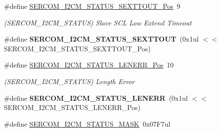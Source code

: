 \begin{DoxyCompactItemize}
\item 
\hypertarget{group___s_a_m_l21___s_e_r_c_o_m_gad74043fef8f65fd41e3b3f9534e2b634}{}\#define \hyperlink{group___s_a_m_l21___s_e_r_c_o_m_gad74043fef8f65fd41e3b3f9534e2b634}{S\+E\+R\+C\+O\+M\+\_\+\+I2\+C\+M\+\_\+\+S\+T\+A\+T\+U\+S\+\_\+\+S\+E\+X\+T\+T\+O\+U\+T\+\_\+\+Pos}~9\label{group___s_a_m_l21___s_e_r_c_o_m_gad74043fef8f65fd41e3b3f9534e2b634}

\begin{DoxyCompactList}\small\item\em (S\+E\+R\+C\+O\+M\+\_\+\+I2\+C\+M\+\_\+\+S\+T\+A\+T\+U\+S) Slave S\+C\+L Low Extend Timeout \end{DoxyCompactList}\item 
\hypertarget{group___s_a_m_l21___s_e_r_c_o_m_ga58276622f55c08b70b9b63bb868cc93f}{}\#define {\bfseries S\+E\+R\+C\+O\+M\+\_\+\+I2\+C\+M\+\_\+\+S\+T\+A\+T\+U\+S\+\_\+\+S\+E\+X\+T\+T\+O\+U\+T}~(0x1ul $<$$<$ S\+E\+R\+C\+O\+M\+\_\+\+I2\+C\+M\+\_\+\+S\+T\+A\+T\+U\+S\+\_\+\+S\+E\+X\+T\+T\+O\+U\+T\+\_\+\+Pos)\label{group___s_a_m_l21___s_e_r_c_o_m_ga58276622f55c08b70b9b63bb868cc93f}

\item 
\hypertarget{group___s_a_m_l21___s_e_r_c_o_m_ga41947e3770e63546711caaab86f7988b}{}\#define \hyperlink{group___s_a_m_l21___s_e_r_c_o_m_ga41947e3770e63546711caaab86f7988b}{S\+E\+R\+C\+O\+M\+\_\+\+I2\+C\+M\+\_\+\+S\+T\+A\+T\+U\+S\+\_\+\+L\+E\+N\+E\+R\+R\+\_\+\+Pos}~10\label{group___s_a_m_l21___s_e_r_c_o_m_ga41947e3770e63546711caaab86f7988b}

\begin{DoxyCompactList}\small\item\em (S\+E\+R\+C\+O\+M\+\_\+\+I2\+C\+M\+\_\+\+S\+T\+A\+T\+U\+S) Length Error \end{DoxyCompactList}\item 
\hypertarget{group___s_a_m_l21___s_e_r_c_o_m_gac6dffc192931978069daa23d6150013e}{}\#define {\bfseries S\+E\+R\+C\+O\+M\+\_\+\+I2\+C\+M\+\_\+\+S\+T\+A\+T\+U\+S\+\_\+\+L\+E\+N\+E\+R\+R}~(0x1ul $<$$<$ S\+E\+R\+C\+O\+M\+\_\+\+I2\+C\+M\+\_\+\+S\+T\+A\+T\+U\+S\+\_\+\+L\+E\+N\+E\+R\+R\+\_\+\+Pos)\label{group___s_a_m_l21___s_e_r_c_o_m_gac6dffc192931978069daa23d6150013e}

\item 
\hypertarget{group___s_a_m_l21___s_e_r_c_o_m_ga0fa56c1fea0aa0e3eb48362289dc465b}{}\#define \hyperlink{group___s_a_m_l21___s_e_r_c_o_m_ga0fa56c1fea0aa0e3eb48362289dc465b}{S\+E\+R\+C\+O\+M\+\_\+\+I2\+C\+M\+\_\+\+S\+T\+A\+T\+U\+S\+\_\+\+M\+A\+S\+K}~0x07\+F7ul\label{group___s_a_m_l21___s_e_r_c_o_m_ga0fa56c1fea0aa0e3eb48362289dc465b}


\end{DoxyCompactItemize}
